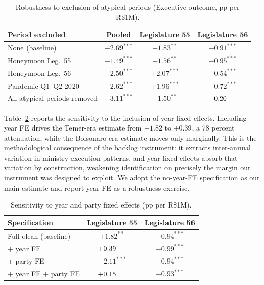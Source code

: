 \documentclass[pdflatex,sn-basic]{sn-jnl}
\begin{document}
\begin{table}[htbp]
\centering
\caption{Robustness to exclusion of atypical periods (Executive outcome, pp per R\$1M).}
\label{tab:atypical}
\small
\begin{tabular}{lccc}
\toprule
Period excluded & Pooled & Legislature 55 & Legislature 56 \\
\midrule
None (baseline)              & $-2.69^{***}$ & $+1.83^{**}$  & $-0.91^{***}$ \\
Honeymoon Leg.~55             & $-1.49^{***}$ & $+1.56^{**}$  & $-0.95^{***}$ \\
Honeymoon Leg.~56             & $-2.50^{***}$ & $+2.07^{***}$ & $-0.54^{***}$ \\
Pandemic Q1--Q2 2020         & $-2.62^{***}$ & $+1.96^{***}$ & $-0.72^{***}$ \\
All atypical periods removed & $-3.11^{***}$ & $+1.50^{**}$  & $-0.20\hspace{1.4em}$ \\
\bottomrule
\end{tabular}
\end{table}

Table~\ref{tab:yearfe} reports the sensitivity to the inclusion of year fixed effects. Including year FE drives the Temer-era estimate from $+1.82$ to $+0.39$, a 78 percent attenuation, while the Bolsonaro-era estimate moves only marginally. This is the methodological consequence of the backlog instrument: it extracts inter-annual variation in ministry execution patterns, and year fixed effects absorb that variation by construction, weakening identification on precisely the margin our instrument was designed to exploit. We adopt the no-year-FE specification as our main estimate and report year-FE as a robustness exercise.

\begin{table}[htbp]
\centering
\caption{Sensitivity to year and party fixed effects (pp per R\$1M).}
\label{tab:yearfe}
\small
\begin{tabular}{lcc}
\toprule
Specification & Legislature 55 & Legislature 56 \\
\midrule
Full-clean (baseline)                & $+1.82^{**}$  & $-0.94^{***}$ \\
\quad + year FE                      & $+0.39\hspace{1.4em}$ & $-0.99^{***}$ \\
\quad + party FE                     & $+2.11^{***}$ & $-0.94^{***}$ \\
\quad + year FE + party FE           & $+0.15\hspace{1.4em}$ & $-0.93^{***}$ \\
\bottomrule
\end{tabular}
\end{table}
\end{document}
